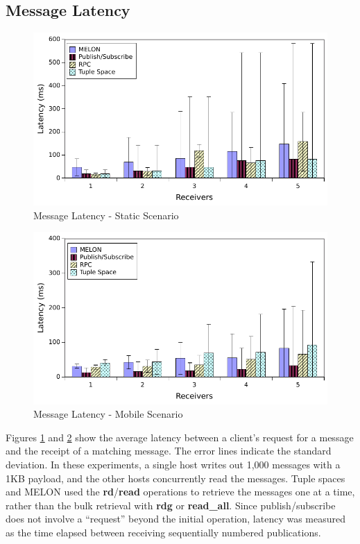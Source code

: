 \subsection{Message Latency}

\begin{figure}
\centering
\includegraphics[width = \linewidth, clip, trim = 0px 0px 0px 0px]{figures/latency_static.pdf}
\caption{Message Latency - Static Scenario}
\label{fig:latencystatic}
\end{figure}

\begin{figure}
\centering
\includegraphics[width = \linewidth, clip, trim = 0px 0px 0px 0px]{figures/latency_mobile.pdf}
\caption{Message Latency - Mobile Scenario}
\label{fig:latencymobile}
\end{figure}

Figures \ref{fig:latencystatic} and \ref{fig:latencymobile} show the average latency between a client's request for a message and the receipt of a matching message. The error lines indicate the standard deviation. In these experiments, a single host writes out 1,000 messages with a 1KB payload, and the other hosts concurrently read the messages. Tuple spaces and MELON used the \textbf{rd}/\textbf{read} operations to retrieve the messages one at a time, rather than the bulk retrieval with \textbf{rdg} or \textbf{read\_all}. Since publish/subscribe does not involve a ``request'' beyond the initial operation, latency was measured as the time elapsed between receiving sequentially numbered publications.

